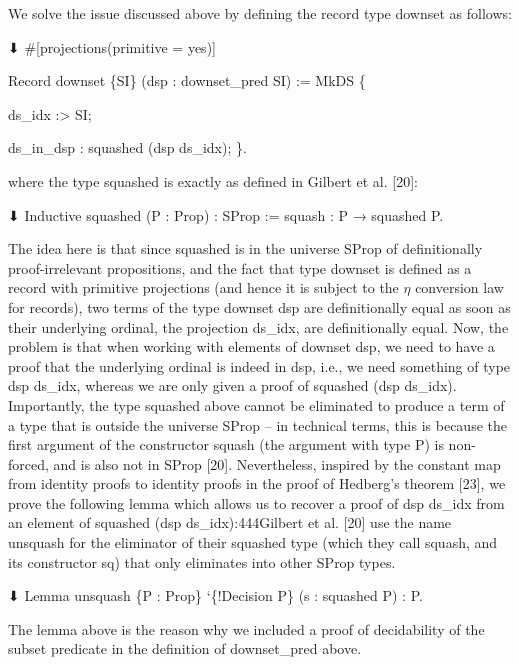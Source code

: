  
We solve the issue discussed above by defining the record type downset as follows:\par
  ⬇ 
 \#[projections(primitive = yes)] 
 
 Record downset \{SI\} (dsp : downset\_pred SI) := MkDS \{ 
 
  ds\_idx :> SI; 
 
  ds\_in\_dsp : squashed (dsp ds\_idx); \}. 
  
where the type squashed is exactly as defined in Gilbert et al. [20]:\par
  ⬇ 
 Inductive squashed (P : Prop) : SProp := squash : P → squashed P. 
  
The idea here is that since squashed is in the universe SProp of definitionally proof-irrelevant propositions, and the fact that type downset is defined as a record with primitive projections (and hence it is subject to the $\eta$ conversion law for records), two terms of the type downset dsp are definitionally equal as soon as their underlying ordinal, the projection ds\_idx, are definitionally equal. Now, the problem is that when working with elements of downset dsp, we need to have a proof that the underlying ordinal is indeed in dsp, i.e., we need something of type dsp ds\_idx, whereas we are only given a proof of squashed (dsp ds\_idx). Importantly, the type squashed above cannot be eliminated to produce a term of a type that is outside the universe SProp – in technical terms, this is because the first argument of the constructor squash (the argument with type P) is non-forced, and is also not in SProp [20]. Nevertheless, inspired by the constant map from identity proofs to identity proofs in the proof of Hedberg’s theorem [23], we prove the following lemma which allows us to recover a proof of dsp ds\_idx from an element of squashed (dsp ds\_idx):444Gilbert et al. [20] use the name unsquash for the eliminator of their squashed type (which they call squash, and its constructor sq) that only eliminates into other SProp types.\par
  ⬇ 
 Lemma unsquash \{P : Prop\} ‘\{!Decision P\} (s : squashed P) : P. 
  
The lemma above is the reason why we included a proof of decidability of the subset predicate in the definition of downset\_pred above.\par
 
